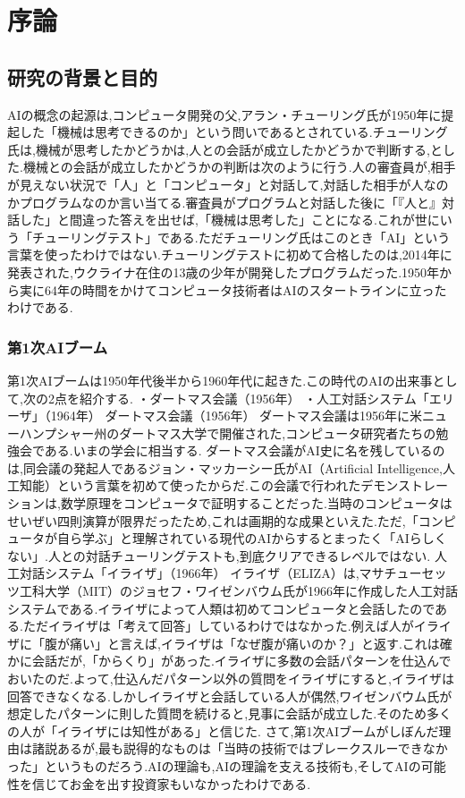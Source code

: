 \chapter{序論}
\section{研究の背景と目的}
AIの概念の起源は,コンピュータ開発の父,アラン・チューリング氏が1950年に提起した「機械は思考できるのか」という問いであるとされている.チューリング氏は,機械が思考したかどうかは,人との会話が成立したかどうかで判断する,とした.機械との会話が成立したかどうかの判断は次のように行う.人の審査員が,相手が見えない状況で「人」と「コンピュータ」と対話して,対話した相手が人なのかプログラムなのか言い当てる.審査員がプログラムと対話した後に「『人と』対話した」と間違った答えを出せば,「機械は思考した」ことになる.これが世にいう「チューリングテスト」である.ただチューリング氏はこのとき「AI」という言葉を使ったわけではない.チューリングテストに初めて合格したのは,2014年に発表された,ウクライナ在住の13歳の少年が開発したプログラムだった.1950年から実に64年の時間をかけてコンピュータ技術者はAIのスタートラインに立ったわけである.
\subsection{第1次AIブーム}
第1次AIブームは1950年代後半から1960年代に起きた.この時代のAIの出来事として,次の2点を紹介する. ・ダートマス会議（1956年） ・人工対話システム「エリーザ」（1964年） ダートマス会議（1956年） ダートマス会議は1956年に米ニューハンプシャー州のダートマス大学で開催された,コンピュータ研究者たちの勉強会である.いまの学会に相当する. ダートマス会議がAI史に名を残しているのは,同会議の発起人であるジョン・マッカーシー氏がAI（Artificial Intelligence,人工知能）という言葉を初めて使ったからだ.この会議で行われたデモンストレーションは,数学原理をコンピュータで証明することだった.当時のコンピュータはせいぜい四則演算が限界だったため,これは画期的な成果といえた.ただ,「コンピュータが自ら学ぶ」と理解されている現代のAIからするとまったく「AIらしくない」.人との対話チューリングテストも,到底クリアできるレベルではない. 人工対話システム「イライザ」（1966年） イライザ（ELIZA）は,マサチューセッツ工科大学（MIT）のジョセフ・ワイゼンバウム氏が1966年に作成した人工対話システムである.イライザによって人類は初めてコンピュータと会話したのである.ただイライザは「考えて回答」しているわけではなかった.例えば人がイライザに「腹が痛い」と言えば,イライザは「なぜ腹が痛いのか？」と返す.これは確かに会話だが,「からくり」があった.イライザに多数の会話パターンを仕込んでおいたのだ.よって,仕込んだパターン以外の質問をイライザにすると,イライザは回答できなくなる.しかしイライザと会話している人が偶然,ワイゼンバウム氏が想定したパターンに則した質問を続けると,見事に会話が成立した.そのため多くの人が「イライザには知性がある」と信じた. さて,第1次AIブームがしぼんだ理由は諸説あるが,最も説得的なものは「当時の技術ではブレークスルーできなかった」というものだろう.AIの理論も,AIの理論を支える技術も,そしてAIの可能性を信じてお金を出す投資家もいなかったわけである.
